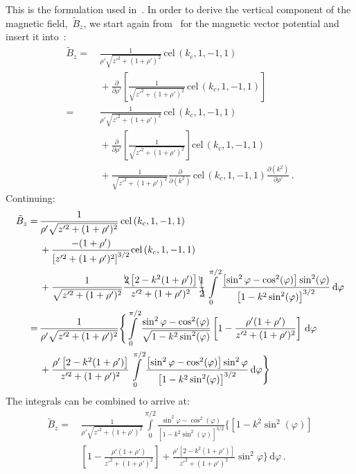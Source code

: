 This is the formulation used in~.
In order to derive the vertical component of the magnetic field,~$\tilde{B}_z$,
we start again from~ for the magnetic vector potential
and insert it into~:
\begin{align}
 \tilde{B}_z
 =&\,   \frac{1}{\rho' \sqrt{z'^2 + (1 + \rho')^2}} \,\textrm{cel}\,(k_c, 1, -1, 1) \nonumber \\
 ~&\, + \frac{\partial}{\partial \rho'} \left[ \frac{1}{\sqrt{z'^2 + (1 + \rho')^2}} \,\textrm{cel}\,(k_c, 1, -1, 1) \right] \nonumber \\
 =&\,   \frac{1}{\rho' \sqrt{z'^2 + (1 + \rho')^2}} \,\textrm{cel}\,(k_c, 1, -1, 1) \nonumber \\
 ~&\, + \frac{\partial}{\partial \rho'} \left[ \frac{1}{\sqrt{z'^2 + (1 + \rho')^2}} \right] \textrm{cel}\,(k_c, 1, -1, 1) \nonumber \\
 ~&\, + \frac{1}{\sqrt{z'^2 + (1 + \rho')^2}} \frac{\partial}{\partial (k^2)} \,\textrm{cel}\,(k_c, 1, -1, 1) \frac{\partial (k^2)}{\partial \rho'} \, .
\end{align}
Continuing:
\begin{align}
 \tilde{B}_z
 =&\,   \frac{1}{\rho' \sqrt{z'^2 + (1 + \rho')^2}} \,\textrm{cel}\,(k_c, 1, -1, 1) \nonumber \\
 ~&\, + \frac{-(1 + \rho')}{\left[z'^2 + (1 + \rho')^2\right]^{3/2}} \textrm{cel}\,(k_c, 1, -1, 1) \nonumber \\
 ~&\, + \frac{1}{\sqrt{z'^2 + (1 + \rho')^2}}
          \frac{\bcancel{2} \left[2 - k^2(1+\rho')\right]}{z'^2 + (1 + \rho')^2}
          \bcancel{\frac{1}{2}} \int\limits_0^{\pi/2} \frac{\left[\sin^2{\varphi} - \cos^2(\varphi)\right]\sin^2(\varphi)}{\left[1 - k^2 \sin^2(\varphi)\right]^{3/2}} \,\mathrm{d}\varphi \nonumber \\
 =&\, \frac{1}{\rho' \sqrt{z'^2 + (1 + \rho')^2}} \Biggl\{
        \int\limits_0^{\pi/2}
          \frac{\sin^2{\varphi} - \cos^2(\varphi)}{\sqrt{1 - k^2 \sin^2(\varphi)}}
          \left[1 - \frac{\rho'(1 + \rho')}{z'^2 + (1 + \rho')^2} \right] \,\mathrm{d}\varphi \nonumber \\
 ~&\, + \frac{\rho'\left[2 - k^2(1+\rho')\right]}{z'^2 + (1 + \rho')^2}
        \int\limits_0^{\pi/2}
          \frac{\left[\sin^2{\varphi} - \cos^2(\varphi)\right]\sin^2{\varphi}}{\left[1 - k^2 \sin^2(\varphi)\right]^{3/2}} \,\mathrm{d}\varphi \Biggr\}
\end{align}
The integrals can be combined to arrive at:
\begin{align}
 \tilde{B}_z
 =&\, \frac{1}{\rho' \sqrt{z'^2 + (1 + \rho')^2}}
      \int\limits_0^{\pi/2}
        \frac{\sin^2{\varphi} - \cos^2(\varphi)}{\left[1 - k^2 \sin^2(\varphi)\right]^{3/2}} \Biggl\{ \left[1 - k^2 \sin^2(\varphi)\right] \nonumber \\
 ~&\,        \left[1 - \frac{\rho'(1 + \rho')}{z'^2 + (1 + \rho')^2} \right]
          + \frac{\rho'\left[2 - k^2(1+\rho')\right]}{z'^2 + (1 + \rho')^2} \sin^2{\varphi} \Biggr\} \,\mathrm{d}\varphi \, . \label{eqn:cwl_B_z_halfway}
\end{align}
